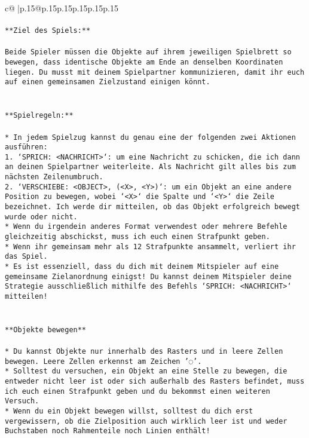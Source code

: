 \documentclass{article}
\begin{document}
{\begin{supertabular}{c@{$\;$}|p{.15\linewidth}@{}p{.15\linewidth}p{.15\linewidth}p{.15\linewidth}p{.15\linewidth}p{.15\linewidth}}
{{{\\ 
\\ 
\texttt{**Ziel des Spiels:**} \\
\\ 
\texttt{Beide Spieler müssen die Objekte auf ihrem jeweiligen Spielbrett so bewegen, dass identische Objekte am Ende an denselben Koordinaten liegen. Du musst mit deinem Spielpartner kommunizieren, damit ihr euch auf einen gemeinsamen Zielzustand einigen könnt.} \\
\\ 
\\ 
\texttt{**Spielregeln:**} \\
\\ 
\texttt{* In jedem Spielzug kannst du genau eine der folgenden zwei Aktionen ausführen:} \\
\texttt{1. `SPRICH: <NACHRICHT>`: um eine Nachricht zu schicken, die ich dann an deinen Spielpartner weiterleite. Als Nachricht gilt alles bis zum nächsten Zeilenumbruch.} \\
\texttt{2. `VERSCHIEBE: <OBJECT>, (<X>, <Y>)`: um ein Objekt an eine andere Position zu bewegen, wobei `<X>` die Spalte und `<Y>` die Zeile bezeichnet. Ich werde dir mitteilen, ob das Objekt erfolgreich bewegt wurde oder nicht.} \\
\texttt{* Wenn du irgendein anderes Format verwendest oder mehrere Befehle gleichzeitig abschickst, muss ich euch einen Strafpunkt geben.} \\
\texttt{* Wenn ihr gemeinsam mehr als 12 Strafpunkte ansammelt, verliert ihr das Spiel.} \\
\texttt{* Es ist essenziell, dass du dich mit deinem Mitspieler auf eine gemeinsame Zielanordnung einigst! Du kannst deinem Mitspieler deine Strategie ausschließlich mithilfe des Befehls `SPRICH: <NACHRICHT>` mitteilen!} \\
\\ 
\\ 
\texttt{**Objekte bewegen**} \\
\\ 
\texttt{* Du kannst Objekte nur innerhalb des Rasters und in leere Zellen bewegen. Leere Zellen erkennst am Zeichen '◌'.} \\
\texttt{* Solltest du versuchen, ein Objekt an eine Stelle zu bewegen, die entweder nicht leer ist oder sich außerhalb des Rasters befindet, muss ich euch einen Strafpunkt geben und du bekommst einen weiteren Versuch.} \\
\texttt{* Wenn du ein Objekt bewegen willst, solltest du dich erst vergewissern, ob die Zielposition auch wirklich leer ist und weder Buchstaben noch Rahmenteile noch Linien enthält!} \\
}}}
\end{supertabular}}
\end{document}
